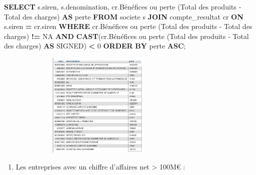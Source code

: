 \documentclass[mstat,12pt]{unswthesis}
\newenvironment{Shaded}{\begin{snugshade}}{\end{snugshade}}
\newcommand{\DecValTok}[1]{\textcolor[rgb]{0.00,0.00,0.81}{#1}}
\newcommand{\FunctionTok}[1]{\textcolor[rgb]{0.13,0.29,0.53}{\textbf{#1}}}
\newcommand{\KeywordTok}[1]{\textcolor[rgb]{0.13,0.29,0.53}{\textbf{#1}}}
\newcommand{\NormalTok}[1]{#1}
\newcommand{\OperatorTok}[1]{\textcolor[rgb]{0.81,0.36,0.00}{\textbf{#1}}}
\newcommand{\StringTok}[1]{\textcolor[rgb]{0.31,0.60,0.02}{#1}}
\begin{document}
\begin{Shaded}
\begin{Highlighting}[]
\KeywordTok{SELECT} 
\NormalTok{  s.siren, }
\NormalTok{  s.denomination, }
\NormalTok{  cr.\textasciigrave{}Bénéfices ou perte (Total des produits ‐ Total des charges)\textasciigrave{} }\KeywordTok{AS}\NormalTok{ perte}
\KeywordTok{FROM} 
\NormalTok{  societe s}
\KeywordTok{JOIN} 
\NormalTok{  compte\_resultat cr }
\KeywordTok{ON} 
\NormalTok{  s.siren }\OperatorTok{=}\NormalTok{ cr.siren}
\KeywordTok{WHERE} 
\NormalTok{  cr.\textasciigrave{}Bénéfices ou perte (Total des produits ‐ Total des charges)\textasciigrave{} }\OperatorTok{!=} \StringTok{\textquotesingle{}NA\textquotesingle{}}
  \KeywordTok{AND} \FunctionTok{CAST}\NormalTok{(cr.\textasciigrave{}Bénéfices ou perte (Total des produits ‐ Total des charges)\textasciigrave{} }\KeywordTok{AS}\NormalTok{ SIGNED) }\OperatorTok{\textless{}} \DecValTok{0}
\KeywordTok{ORDER} \KeywordTok{BY} 
\NormalTok{  perte }\KeywordTok{ASC}\NormalTok{;}
\end{Highlighting}
\end{Shaded}

\includegraphics[width=10cm,height=5cm]{image_sql/liste_taxe_faible}
\newpage

\begin{enumerate}
\def\labelenumi{\arabic{enumi})}
\setcounter{enumi}{6}
\tightlist
\item
  Les entreprises avec un chiffre d'affaires net \textgreater{} 100M€ :
  \medskip
\end{enumerate}
\end{document}
